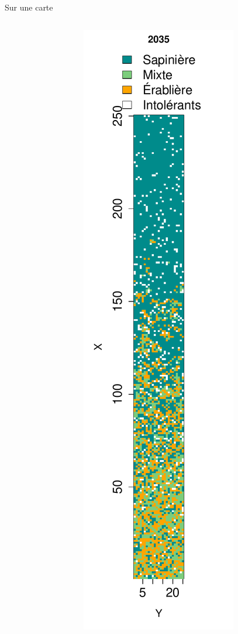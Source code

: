 \documentclass{eecslides}
\begin{document}
\begin{frame}{Sur une carte}
\begin{columns}
\begin{column}{0.25\textwidth}
\begin{center}
				\end{center}	
			\end{column}
			\begin{column}{0.25\textwidth}
				\begin{center}
					\includegraphics[height=0.8\textheight]{largeplot_2035}

\end{center}
\end{column}
\end{columns}
\end{frame}
\end{document}
